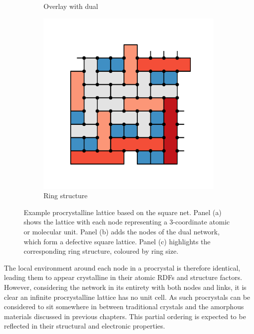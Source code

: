 \begin{figure}[bt]
\begin{subfigure}[b]{0.3\textwidth}
         \caption{Overlay with dual}
         \label{fig:prointrob}
     \end{subfigure}
     \hfill
     \begin{subfigure}[b]{0.3\textwidth}
         \centering
         \includegraphics[width=\textwidth]{./figures/procrystals/pro_intro2.pdf}
         \caption{Ring structure}
         \label{fig:prointroc}
     \end{subfigure}
     
     \caption{Example procrystalline lattice based on the square net. Panel (a) shows the lattice with each node representing a 3\--coordinate atomic or molecular unit. Panel (b) adds the nodes of the dual network, which form a defective square lattice. Panel (c) highlights the corresponding ring structure, coloured by ring size.}
     \label{fig:nprointro}
\end{figure}

The local environment around each node in a procrystal is therefore identical, leading them to appear crystalline in their atomic RDFs and structure factors. 
However, considering the network in its entirety with both nodes and links, it is clear an infinite procrystalline lattice has no unit cell.
As such procrystals can be considered to sit somewhere in between traditional crystals and the amorphous materials discussed in previous chapters.
This partial ordering is expected to be reflected in their structural and electronic properties.

